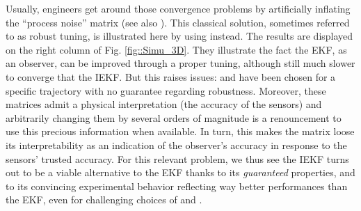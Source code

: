 \documentclass[a4paper,12pt,onecolumn]{article}
\begin{document}
Usually, engineers get around those convergence problems by   artificially inflating the ``process noise'' matrix  (see also \cite{reif}). This classical solution, sometimes referred to as robust tuning, is illustrated here by using    instead. The results are displayed on the right column of Fig. \ref{fig::Simu_3D}. They illustrate the fact the EKF, as an observer, can be improved  through a proper tuning, although still much slower to converge that the IEKF. But this raises issues:  and  have been chosen for a specific trajectory with no guarantee regarding robustness. Moreover, these matrices admit a physical interpretation (the accuracy of the sensors) and arbitrarily changing them by several  orders of magnitude is a renouncement to use this precious information when available. In turn,  this makes  the matrix  loose its interpretability as an indication of the observer's accuracy in response to the sensors' trusted accuracy.  For this relevant problem, we thus see the IEKF turns out to be a viable alternative to the EKF thanks to its \emph{guaranteed} properties, and to its convincing experimental behavior reflecting way better performances than the EKF, even for challenging choices of  and .
\end{document}
